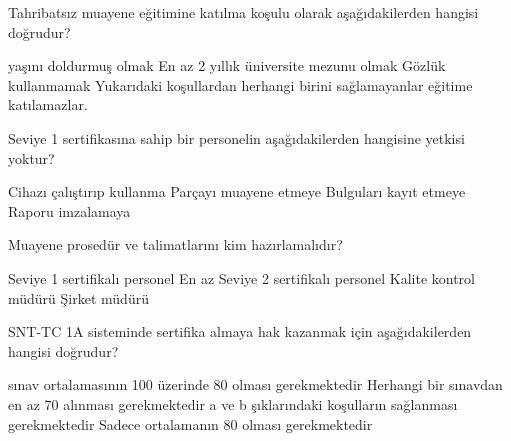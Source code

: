 \begin{question}[subtitle=]
	Tahribatsız muayene eğitimine katılma koşulu olarak aşağıdakilerden hangisi doğrudur?
	
	\begin{tasks}
 yaşını doldurmuş olmak \correct
\task En az  2 yıllık üniversite mezunu olmak
\task Gözlük kullanmamak
\task Yukarıdaki koşullardan herhangi birini sağlamayanlar eğitime katılamazlar.

	\end{tasks}
\end{question}
\begin{solution}
	\correct
\end{solution}

\begin{question}[subtitle=]
	Seviye 1 sertifikasına sahip bir personelin aşağıdakilerden hangisine yetkisi yoktur?
	
	\begin{tasks}
		\task Cihazı çalıştırıp kullanma
		\task Parçayı muayene etmeye
		\task Bulguları kayıt etmeye
		\task Raporu imzalamaya \correct
	
	\end{tasks}
\end{question}
\begin{solution}
	\correct
\end{solution}

\begin{question}[subtitle=]
	Muayene prosedür ve talimatlarını kim hazırlamalıdır?
	
	\begin{tasks}
		\task Seviye 1 sertifikalı personel
		\task En az Seviye 2 sertifikalı personel \correct
		\task Kalite kontrol müdürü
		\task Şirket müdürü 
			
	\end{tasks}
\end{question}
\begin{solution}
	\correct
\end{solution}

\begin{question}[subtitle=]
	SNT-TC 1A  sisteminde sertifika almaya hak kazanmak için aşağıdakilerden hangisi doğrudur?
	
	\begin{tasks}
		 sınav ortalamasının 100 üzerinde 80 olması gerekmektedir
		\task Herhangi bir sınavdan en az 70 alınması gerekmektedir 
		\task a ve b şıklarındaki koşulların sağlanması gerekmektedir \correct
		\task Sadece ortalamanın 80 olması gerekmektedir

	\end{tasks}
\end{question}
\begin{solution}
	\correct
\end{solution}


